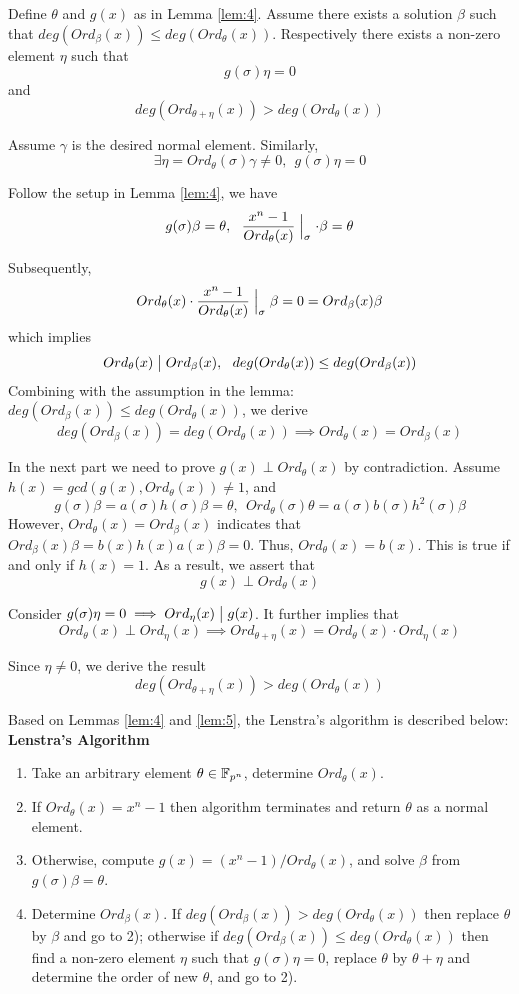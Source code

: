 \begin{Lemma}
\label{lem:5}
Define $\theta$ and $g(x)$ as in Lemma \ref{lem:4}. Assume there exists a solution 
$\beta$ such that $deg(Ord_\beta(x)) \leq deg(Ord_\theta(x))$. Respectively there exists a non-zero element $\eta$ such that
$$g(\sigma)\eta = 0$$
and
$$deg(Ord_{\theta+\eta}(x)) > deg(Ord_\theta(x))$$
\end{Lemma}
\begin{Proof}
Assume $\gamma$ is the desired normal element. Similarly,
$$\exists \eta = Ord_\theta(\sigma)\gamma \neq 0,~~g(\sigma)\eta = 0$$

Follow the setup in Lemma \ref{lem:4}, we have
$$g(\sigma)\beta = \theta,~~\frac{x^n-1}{Ord_\theta(x)}\Bigm|_\sigma\cdot \beta = \theta$$

Subsequently,
$$Ord_\theta(x)\cdot \frac{x^n-1}{Ord_\theta(x)}\Bigm|_\sigma\beta = 0 = Ord_\beta(x)\beta$$
which implies
$$Ord_\theta(x)\bigm|Ord_\beta(x),~~deg(Ord_\theta(x)) \leq deg(Ord_\beta(x))$$
Combining with the assumption in the lemma: $deg(Ord_\beta(x)) \leq deg(Ord_\theta(x))$, we derive
$$deg(Ord_\beta(x)) = deg(Ord_\theta(x))\implies Ord_\theta(x) =Ord_\beta(x)$$

In the next part we need to prove $g(x)\perp Ord_\theta(x)$ by contradiction. Assume 
$h(x) = gcd(g(x),Ord_\theta(x))\neq 1$, and
$$g(\sigma)\beta = a(\sigma)h(\sigma)\beta = \theta,~~Ord_\theta(\sigma)\theta = a(\sigma)b(\sigma)h^2(\sigma)\beta$$
However, $Ord_\theta(x) =Ord_\beta(x)$ indicates that $Ord_\beta(x)\beta = b(x)h(x)a(x)\beta = 0$. Thus,
$Ord_\theta(x)=b(x)$. This is true if and only if $h(x)=1$. As a result, we assert that
$$g(x) \perp Ord_\theta(x)$$

Consider $g(\sigma)\eta = 0 \implies Ord_\eta(x)\bigm|g(x)$. It further implies that 
$$Ord_\theta(x)\perp Ord_\eta(x) \implies Ord_{\theta+\eta}(x) = Ord_\theta(x)\cdot Ord_\eta(x)$$

Since $\eta \neq 0$, we derive the result
$$deg(Ord_{\theta+\eta}(x)) > deg(Ord_\theta(x))$$
\end{Proof}

Based on Lemmas \ref{lem:4} and \ref{lem:5}, the Lenstra's algorithm is described below:\\
\textbf{Lenstra's Algorithm}
\begin{enumerate}[{1)}]
\item Take an arbitrary element $\theta \in {\mathbb{F}}_{p^n}$, determine $Ord_\theta(x)$.
\item If $Ord_\theta(x) = x^n - 1$ then algorithm terminates and return $\theta$ as a normal element.
\item Otherwise, compute $g(x) = (x^n - 1)/Ord_\theta(x)$, and solve $\beta$ from $g(\sigma)\beta = \theta$.
\item Determine $Ord_\beta(x)$. If $deg(Ord_\beta(x)) > deg(Ord_\theta(x))$ then replace $\theta$ by $\beta$ and go to 2);
otherwise if $deg(Ord_\beta(x)) \leq deg(Ord_\theta(x))$ then find a non-zero element $\eta$ such that $g(\sigma)\eta = 0$,
replace $\theta$ by $\theta + \eta$ and determine the order of new $\theta$, and go to 2).
\end{enumerate}

